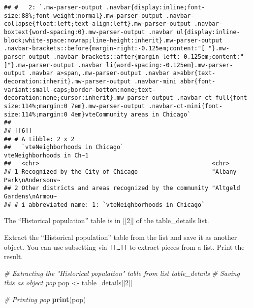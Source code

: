 \documentclass[
]{article}
\newenvironment{Shaded}{\begin{snugshade}}{\end{snugshade}}
\newcommand{\CommentTok}[1]{\textcolor[rgb]{0.56,0.35,0.01}{\textit{#1}}}
\newcommand{\DecValTok}[1]{\textcolor[rgb]{0.00,0.00,0.81}{#1}}
\newcommand{\FunctionTok}[1]{\textcolor[rgb]{0.13,0.29,0.53}{\textbf{#1}}}
\newcommand{\NormalTok}[1]{#1}
\newcommand{\OtherTok}[1]{\textcolor[rgb]{0.56,0.35,0.01}{#1}}
\begin{document}
\begin{verbatim}
## #   2: `.mw-parser-output .navbar{display:inline;font-size:88%;font-weight:normal}.mw-parser-output .navbar-collapse{float:left;text-align:left}.mw-parser-output .navbar-boxtext{word-spacing:0}.mw-parser-output .navbar ul{display:inline-block;white-space:nowrap;line-height:inherit}.mw-parser-output .navbar-brackets::before{margin-right:-0.125em;content:"[ "}.mw-parser-output .navbar-brackets::after{margin-left:-0.125em;content:" ]"}.mw-parser-output .navbar li{word-spacing:-0.125em}.mw-parser-output .navbar a>span,.mw-parser-output .navbar a>abbr{text-decoration:inherit}.mw-parser-output .navbar-mini abbr{font-variant:small-caps;border-bottom:none;text-decoration:none;cursor:inherit}.mw-parser-output .navbar-ct-full{font-size:114%;margin:0 7em}.mw-parser-output .navbar-ct-mini{font-size:114%;margin:0 4em}vteCommunity areas in Chicago`
## 
## [[6]]
## # A tibble: 2 x 2
##   `vteNeighborhoods in Chicago`                         vteNeighborhoods in Ch~1
##   <chr>                                                 <chr>                   
## 1 Recognized by the City of Chicago                     "Albany Park\nAndersonv~
## 2 Other districts and areas recognized by the community "Altgeld Gardens\nArmou~
## # i abbreviated name: 1: `vteNeighborhoods in Chicago`
\end{verbatim}

The ``Historical population'' table is in {[}{[}2{]}{]} of the
table\_details list.

Extract the ``Historical population'' table from the list and save it as
another object. You can use subsetting via \texttt{{[}{[}…{]}{]}} to
extract pieces from a list. Print the result.

\begin{Shaded}
\begin{Highlighting}[]
\CommentTok{\# Extracting the "Historical population" table from list table\_details }
\CommentTok{\# Saving this as object pop}
\NormalTok{pop }\OtherTok{\textless{}{-}}\NormalTok{ table\_details[[}\DecValTok{2}\NormalTok{]]}

\CommentTok{\# Printing pop}
\FunctionTok{print}\NormalTok{(pop)}
\end{Highlighting}
\end{Shaded}
\end{document}
